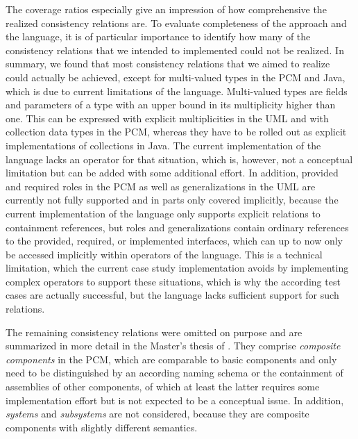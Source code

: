 The coverage ratios especially give an impression of how comprehensive the realized consistency relations are.
To evaluate completeness of the \commonalities approach and the language, it is of particular importance to identify how many of the consistency relations that we intended to implemented could not be realized.
In summary, we found that most consistency relations that we aimed to realize could actually be achieved, except for multi-valued types in the \gls{PCM} and Java, which is due to current limitations of the language.
Multi-valued types are fields and parameters of a type with an upper bound in its multiplicity higher than one.
This can be expressed with explicit multiplicities in the \gls{UML} and with collection data types in the \gls{PCM}, whereas they have to be rolled out as explicit implementations of collections in Java.
The current implementation of the \commonalities language lacks an operator for that situation, which is, however, not a conceptual limitation but can be added with some additional effort.
In addition, provided and required roles in the \gls{PCM} as well as generalizations in the \gls{UML} are currently not fully supported and in parts only covered implicitly, because the current implementation of the \commonalities language only supports explicit relations to containment references, but roles and generalizations contain ordinary references to the provided, required, or implemented interfaces, which can up to now only be accessed implicitly within operators of the \commonalities language.
This is a technical limitation, which the current case study implementation avoids by implementing complex operators to support these situations, which is why the according test cases are actually successful, but the language lacks sufficient support for such relations.

The remaining consistency relations were omitted on purpose and are summarized in more detail in the Master's thesis of .
They comprise \emph{composite components} in the \gls{PCM}, which are comparable to basic components and only need to be distinguished by an according naming schema or the containment of assemblies of other components, of which at least the latter requires some implementation effort but is not expected to be a conceptual issue.
In addition, \emph{systems} and \emph{subsystems} are not considered, because they are composite components with slightly different semantics.

